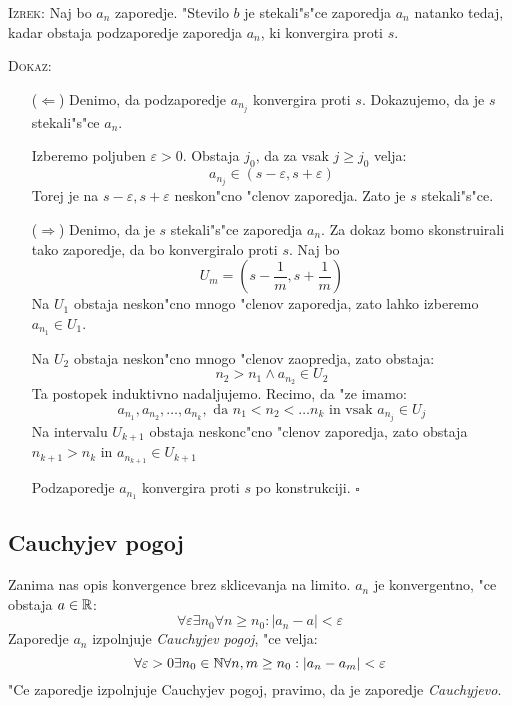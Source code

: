 \textsc{Izrek:} Naj bo $a_n$ zaporedje. "Stevilo $b$ je stekali"s"ce zaporedja $a_n$ natanko tedaj, kadar obstaja podzaporedje zaporedja $a_n$, ki konvergira proti $s$.

\textsc{Dokaz:}
\begin{itemize}
	\item[($\Leftarrow$)] Denimo, da podzaporedje $a_{n_j}$ konvergira proti $s$. Dokazujemo, da je $s$ stekali"s"ce $a_n$.
	
	Izberemo poljuben $\varepsilon > 0$. Obstaja $j_0$, da za vsak $j \geq j_0$ velja:
	\begin{equation*}
	a_{n_j} \in (s - \varepsilon, s+ \varepsilon)
	\end{equation*}
	Torej je na $s - \varepsilon, s + \varepsilon$ neskon"cno "clenov zaporedja. Zato je $s$ stekali"s"ce.
	
	\item[($\Rightarrow$)] Denimo, da je $s$ stekali"s"ce zaporedja $a_n$. Za dokaz bomo skonstruirali tako zaporedje, da bo konvergiralo proti $s$. Naj bo
	\begin{equation*}
	U_m = (s - \dfrac{1}{m}, s + \dfrac{1}{m})
	\end{equation*}
	Na $U_1$ obstaja neskon"cno mnogo "clenov zaporedja, zato lahko izberemo $a_{n_1} \in U_1$.
	
	Na $U_2$ obstaja neskon"cno mnogo "clenov zaopredja, zato obstaja:
	\begin{equation*}
	n_2 > n_1 \land a_{n_2} \in U_2
	\end{equation*}
	Ta postopek induktivno nadaljujemo. Recimo, da "ze imamo:
	\begin{equation*}
	a_{n_1}, a_{n_2}, \ldots, a_{n_k}, \text{ da } n_1 < n_2 < \ldots n_k \text{ in vsak } a_{n_j} \in U_j
	\end{equation*}
	Na intervalu $U_{k+1}$ obstaja neskonc"cno "clenov zaporedja, zato obstaja $n_{k+1} > n_k$ in $a_{n_{k+1}} \in U_{k+1}$
	
	Podzaporedje $a_{n_1}$ konvergira proti $s$ po konstrukciji. \hfill $\square$
\end{itemize}

\subsection{Cauchyjev pogoj}
Zanima nas opis konvergence brez sklicevanja na limito. $a_n$ je konvergentno, "ce obstaja $a \in \mathbb{R}$:
\begin{equation*}
\forall \varepsilon \exists n_0 \forall n \geq n_0: |a_n - a| < \varepsilon
\end{equation*}
 Zaporedje $a_n$ izpolnjuje \emph{Cauchyjev pogoj}, "ce velja:
\begin{equation*}
\forall \varepsilon > 0 \exists n_0 \in \mathbb{N} \forall n, m \geq n_0: |a_n - a_m| < \varepsilon
\end{equation*}
"Ce zaporedje izpolnjuje Cauchyjev pogoj, pravimo, da je zaporedje \emph{Cauchyjevo}.

